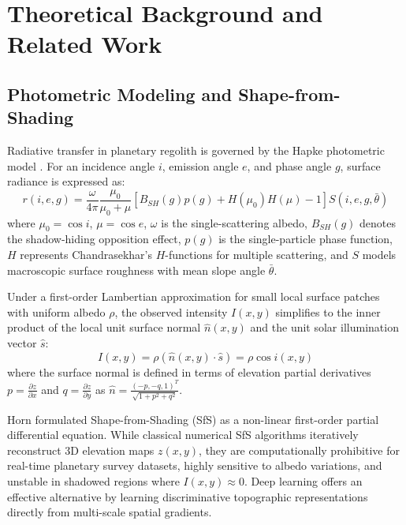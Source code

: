 \documentclass[10pt,journal,compsoc]{IEEEtran}
\theoremstyle{definition}
\begin{document}
\section{Theoretical Background and Related Work}

\subsection{Photometric Modeling and Shape-from-Shading}
Radiative transfer in planetary regolith is governed by the Hapke photometric model \cite{hapke2012theory}. For an incidence angle $i$, emission angle $e$, and phase angle $g$, surface radiance is expressed as:
\begin{equation}
r(i, e, g) = \frac{\omega}{4\pi} \frac{\mu_0}{\mu_0 + \mu} \left[ B_{SH}(g) p(g) + H(\mu_0) H(\mu) - 1 \right] S(i, e, g, \bar{\theta})
\label{eq:hapke}
\end{equation}
where $\mu_0 = \cos i$, $\mu = \cos e$, $\omega$ is the single-scattering albedo, $B_{SH}(g)$ denotes the shadow-hiding opposition effect, $p(g)$ is the single-particle phase function, $H$ represents Chandrasekhar's $H$-functions for multiple scattering, and $S$ models macroscopic surface roughness with mean slope angle $\bar{\theta}$.

Under a first-order Lambertian approximation for small local surface patches with uniform albedo $\rho$, the observed intensity $I(x,y)$ simplifies to the inner product of the local unit surface normal $\hat{n}(x,y)$ and the unit solar illumination vector $\hat{s}$:
\begin{equation}
I(x,y) = \rho (\hat{n}(x,y) \cdot \hat{s}) = \rho \cos i(x,y)
\label{eq:lambert}
\end{equation}
where the surface normal is defined in terms of elevation partial derivatives $p = \frac{\partial z}{\partial x}$ and $q = \frac{\partial z}{\partial y}$ as $\hat{n} = \frac{(-p, -q, 1)^T}{\sqrt{1 + p^2 + q^2}}$.

Horn \cite{horn1970shape} formulated Shape-from-Shading (SfS) as a non-linear first-order partial differential equation. While classical numerical SfS algorithms iteratively reconstruct 3D elevation maps $z(x,y)$, they are computationally prohibitive for real-time planetary survey datasets, highly sensitive to albedo variations, and unstable in shadowed regions where $I(x,y) \approx 0$. Deep learning offers an effective alternative by learning discriminative topographic representations directly from multi-scale spatial gradients.
\end{document}

